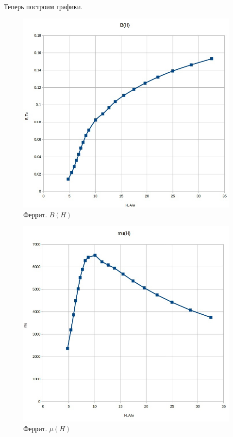 \documentclass[a4paper,12pt]{article} %
\begin{document}
\newpage
Теперь построим графики.

\begin{figure}[h!]
	\centering
	\includegraphics[scale=0.43]{Pictures/ФЕРРИТ_B(H).jpg}
	\caption{Феррит. $B(H)$}
\end{figure}

\begin{figure}[h!]
	\centering
	\includegraphics[scale=0.43]{Pictures/ФЕРРИТ_mu(H).jpg}
	\caption{Феррит. $\mu (H)$}
\end{figure}
\end{document}
